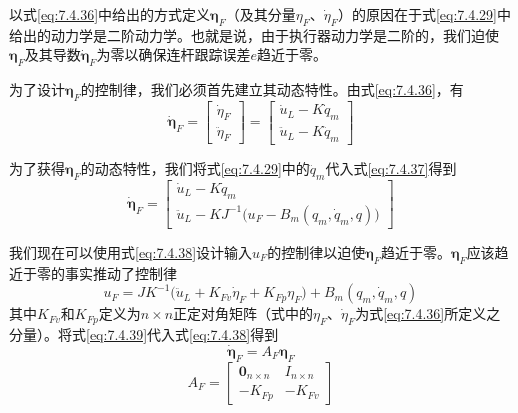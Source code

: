 \documentclass[UTF8]{ctexart}
\begin{document}
以式\eqref{eq:7.4.36}中给出的方式定义$\boldsymbol{\eta}_F$（及其分量$\eta_F$、$\dot{\eta}_F$）的原因在于式\eqref{eq:7.4.29}中给出的动力学是二阶动力学。也就是说，由于执行器动力学是二阶的，我们迫使$\boldsymbol{\eta}_F$及其导数$\dot{\boldsymbol{\eta}}_F$为零以确保连杆跟踪误差$e$趋近于零。

为了设计$\boldsymbol{\eta}_F$的控制律，我们必须首先建立其动态特性。由式\eqref{eq:7.4.36}，有
\begin{equation}\label{eq:7.4.37}
\dot{\boldsymbol{\eta}}_F = \begin{bmatrix} \dot{\eta}_F \\ \ddot{\eta}_F \end{bmatrix} = \begin{bmatrix} \dot{u}_L - K \dot{q}_m \\ \ddot{u}_L - K \ddot{q}_m \end{bmatrix}
\end{equation}

为了获得$\boldsymbol{\eta}_F$的动态特性，我们将式\eqref{eq:7.4.29}中的$\ddot{q}_m$代入式\eqref{eq:7.4.37}得到
\begin{equation}\label{eq:7.4.38}
\dot{\boldsymbol{\eta}}_F = \begin{bmatrix} \dot{u}_L - K \dot{q}_m \\ \ddot{u}_L - K J^{-1}\bigl(u_F - B_m(q_m,\dot{q}_m,q)\bigr) \end{bmatrix}
\end{equation}

我们现在可以使用式\eqref{eq:7.4.38}设计输入$u_F$的控制律以迫使$\boldsymbol{\eta}_F$趋近于零。$\boldsymbol{\eta}_F$应该趋近于零的事实推动了控制律
\begin{equation}\label{eq:7.4.39}
u_F = J K^{-1}\bigl(\ddot{u}_L + K_{Fv}\dot{\eta}_F + K_{Fp}\eta_F\bigr) + B_m(q_m,\dot{q}_m,q)
\end{equation}
其中$K_{Fv}$和$K_{Fp}$定义为$n \times n$正定对角矩阵（式中的$\eta_F$、$\dot{\eta}_F$为式\eqref{eq:7.4.36}所定义之分量）。将式\eqref{eq:7.4.39}代入式\eqref{eq:7.4.38}得到
\begin{equation}\label{eq:7.4.40}
\dot{\boldsymbol{\eta}}_F = A_F \boldsymbol{\eta}_F
\end{equation}
\begin{equation*}
A_F = \begin{bmatrix} \boldsymbol{0}_{n \times n} & I_{n \times n} \\ -K_{Fp} & -K_{Fv} \end{bmatrix}
\end{equation*}
\end{document}
